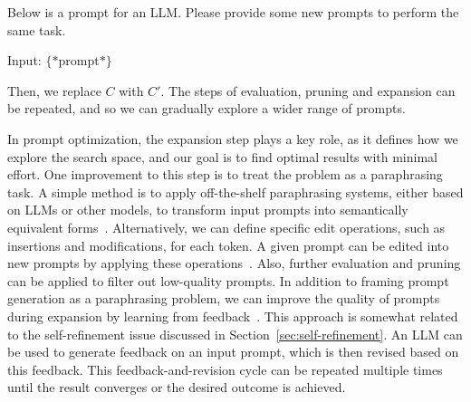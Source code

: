 \begin{itemize}
\vspace{0.5em}
\begin{tcolorbox}

\begingroup
\setlength{\leftskip}{2em}
\setlength{\rightskip}{2em}

Below is a prompt for an LLM. Please provide some new prompts to perform the same task.

\vspace{0.5em}

Input: $\{*\mathrm{prompt}*\}$

\vspace{0.5em}

\underline{\hspace{2em}}

\endgroup

\end{tcolorbox}
\vspace{0.5em}

Then, we replace $C$ with $C'$. The steps of evaluation, pruning and expansion can be repeated, and so we can gradually explore a wider range of prompts.

\end{itemize}
\vspace{0.5em}

In prompt optimization, the expansion step plays a key role, as it defines how we explore the search space, and our goal is to find optimal results with minimal effort. One improvement to this step is to treat the problem as a paraphrasing task. A simple method is to apply off-the-shelf paraphrasing systems, either based on LLMs or other models, to transform input prompts into semantically equivalent forms~\cite{jiang-etal:2020can}. Alternatively, we can define specific edit operations, such as insertions and modifications, for each token. A given prompt can be edited into new prompts by applying these operations~\cite{prasad-etal:2023grips}. Also, further evaluation and pruning can be applied to filter out low-quality prompts. In addition to framing prompt generation as a paraphrasing problem, we can improve the quality of prompts during expansion by learning from feedback~\cite{pryzant-etal:2023automatic}. This approach is somewhat related to the self-refinement issue discussed in Section~\ref{sec:self-refinement}. An LLM can be used to generate feedback on an input prompt, which is then revised based on this feedback. This feedback-and-revision cycle can be repeated multiple times until the result converges or the desired outcome is achieved.

